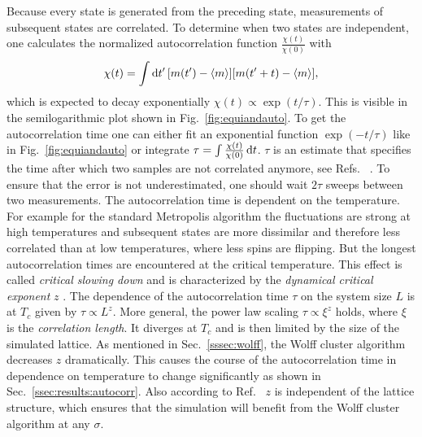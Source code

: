         Because every state is generated from the preceding state, measurements
        of subsequent states are correlated. To determine when two states
        are independent, one calculates the normalized autocorrelation function
        \(\frac{\chi(t)}{\chi(0)}\) with
        \begin{equation}
            \chi(t) = \int \mathrm{d} t' \, [m(t') -\left< m \right>][m(t'+t)-\left< m \right>],
        \end{equation}
        which is expected to decay exponentially
        \(\chi(t) \propto \exp(t/\tau)\). This is visible in the semilogarithmic
        plot shown in  Fig.\ \ref{fig:equiandauto}.
        To get the autocorrelation time one can either fit an exponential
        function \(\exp(-t/\tau)\) like in Fig.\ \ref{fig:equiandauto}
        or integrate \(\tau = \int \frac{\chi(t)}{\chi(0)} \,\mathrm{d} t\).
        \(\tau\) is an estimate that specifies the time after which two
        samples are not correlated anymore, see Refs.\ \cite[p. 59ff]{NewmanBarkema1999} \cite[p. 150f]{Katzgraber2011}.
        To ensure that the error is not underestimated, one should wait
        \(2\tau\) sweeps between two measurements.
        The autocorrelation time is dependent on the temperature.
        For example for the standard Metropolis algorithm the fluctuations
        are strong at high temperatures and subsequent
        states are more dissimilar and therefore less correlated than at low
        temperatures, where less spins are flipping. But the longest
        autocorrelation times are encountered at the critical temperature.
        This effect is called \emph{critical slowing down} and is
        characterized by the \emph{dynamical critical exponent} \(z\)
        \cite{SwendsenWang1987}. The dependence of the autocorrelation time
        \(\tau\) on the system size \(L\) is at \(T_{c}\) given by \(\tau \propto L^z\).
        More general, the power law scaling \(\tau \propto \xi^z\) holds, where
        \(\xi\) is the \emph{correlation length}. It diverges at
        \(T_{c}\) and is then limited by the size of the simulated lattice.
        As mentioned in Sec.\ \ref{sssec:wolff}, the Wolff cluster algorithm
        decreases \(z\) dramatically. This causes the course of the autocorrelation
        time in dependence on temperature to change significantly as shown in
        Sec.\ \ref{ssec:results:autocorr}. Also according to Ref.\ \cite{NewmanBarkema1999}
        \(z\) is independent of the lattice structure, which ensures that
        the simulation will benefit from the Wolff cluster algorithm at
        any \(\sigma\).

